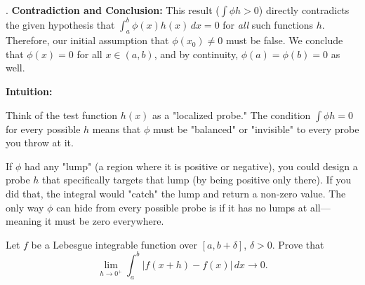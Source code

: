 \begin{solution}
\par{}. \textbf{Contradiction and Conclusion:} This result ($\int \phi h > 0$) directly contradicts the given hypothesis that $\int_a^b \phi(x)h(x) \, dx = 0$ for \textit{all} such functions $h$. 
Therefore, our initial assumption that $\phi(x_0) \neq 0$ must be false. We conclude that $\phi(x) = 0$ for all $x \in (a,b)$, and by continuity, $\phi(a) = \phi(b) = 0$ as well.
\par\medskip
\textbf{Intuition:}
\par\medskip
Think of the test function $h(x)$ as a "localized probe." The condition $\int \phi h = 0$ for every possible $h$ means that $\phi$ must be "balanced" or "invisible" to every probe you throw at it. 
\par\medskip
If $\phi$ had any "lump" (a region where it is positive or negative), you could design a probe $h$ that specifically targets that lump (by being positive only there). If you did that, the integral would "catch" the lump and return a non-zero value. The only way $\phi$ can hide from every possible probe is if it has no lumps at all—meaning it must be zero everywhere.
\end{solution}

\begin{exercise}
\label{analysis:2015:8}
Let $f$ be a Lebesgue integrable function over $[a,b+\delta]$, $\delta>0$. Prove that
\[
\lim_{h\to 0^+}\int_a^b |f(x+h)-f(x)|\,dx \to 0.
\]
\end{exercise}

